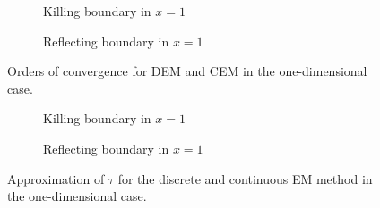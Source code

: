 \begin{figure}[t]
    \centering
    \begin{subfigure}{0.49\linewidth}
        \centering
        \resizebox{1\linewidth}{!}{ }  
        \caption{Killing boundary in $x = 1$}
        \label{fig:KillOneD}
    \end{subfigure}
    \begin{subfigure}{0.49\linewidth}
        \centering
        \resizebox{1\linewidth}{!}{ }  
        \caption{Reflecting boundary in $x = 1$}
        \label{fig:ReflectOneD}
    \end{subfigure}    
    \caption{Orders of convergence for DEM and CEM in the one-dimensional case.}
    \label{fig:OrdersOneD}
\end{figure}

\begin{figure}[t]
    \centering
    \begin{subfigure}{0.49\linewidth}
        \centering
        \resizebox{1\linewidth}{!}{ }  
        \caption{Killing boundary in $x = 1$}
        \label{fig:ApproxOneD}
    \end{subfigure}
    \begin{subfigure}{0.49\linewidth}
        \centering
        \resizebox{1\linewidth}{!}{ }  
        \caption{Reflecting boundary in $x = 1$}
        \label{fig:ApproxOneD}
    \end{subfigure}    
    \caption{Approximation of $\tau$ for the discrete and continuous EM method in the one-dimensional case.}
    \label{fig:ApproxOneD}
\end{figure}

